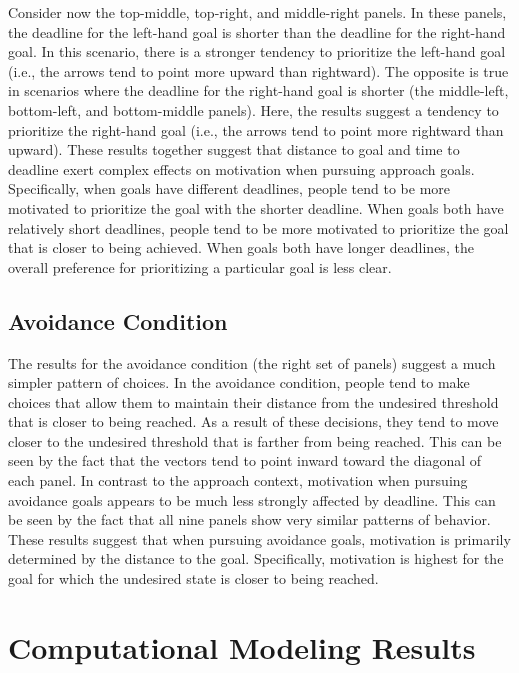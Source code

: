\documentclass[a4paper,doc,natbib,donotrepeattitle]{apa6}
\begin{document}
Consider now the top-middle, top-right, and middle-right panels. In these panels, the deadline for the left-hand goal is shorter than the deadline for the right-hand goal. In this scenario, there is a stronger tendency to prioritize the left-hand goal (i.e., the arrows tend to point more upward than rightward). The opposite is true in scenarios where the deadline for the right-hand goal is shorter (the middle-left, bottom-left, and bottom-middle panels). Here, the results suggest a tendency to prioritize the right-hand goal (i.e., the arrows tend to point more rightward than upward). These results together suggest that distance to goal and time to deadline exert complex effects on motivation when pursuing approach goals. Specifically, when goals have different deadlines, people tend to be more motivated to prioritize the goal with the shorter deadline. When goals both have relatively short deadlines, people tend to be more motivated to prioritize the goal that is closer to being achieved. When goals both have longer deadlines, the overall preference for prioritizing a particular goal is less clear.

\subsection{Avoidance Condition}
The results for the avoidance condition (the right set of panels) suggest a much simpler pattern of choices. In the avoidance condition, people tend to make choices that allow them to maintain their distance from the undesired threshold that is closer to being reached. As a result of these decisions, they tend to move closer to the undesired threshold that is farther from being reached. This can be seen by the fact that the vectors tend to point inward toward the diagonal of each panel. In contrast to the approach context, motivation when pursuing avoidance goals appears to be much less strongly affected by deadline. This can be seen by the fact that all nine panels show very similar patterns of behavior. These results suggest that when pursuing avoidance goals, motivation is primarily determined by the distance to the goal. Specifically, motivation is highest for the goal for which the undesired state is closer to being reached.

\section{Computational Modeling Results}
\end{document}
